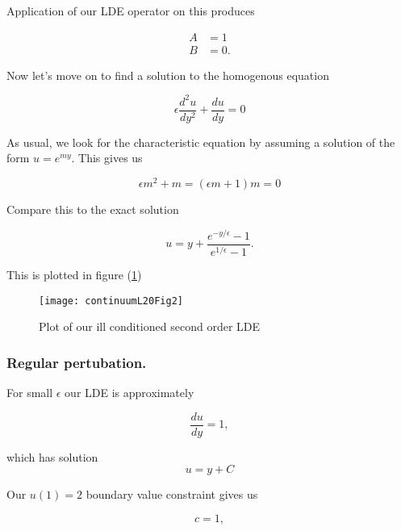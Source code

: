 Application of our LDE operator on this produces

\begin{align*}
A &= 1 \\
B &= 0.
\end{align*}

Now let's move on to find a solution to the homogenous equation

\begin{equation}\label{eqn:continuumL20:30b}
\epsilon \frac{d^2u}{dy^2} + \frac{du}{dy} = 0
\end{equation}

As usual, we look for the characteristic equation by assuming a solution of the form $u = e^{m y}$.  This gives us

\begin{equation}\label{eqn:continuumL20:n}
\epsilon m^2 + m = (\epsilon m + 1) m = 0
\end{equation}

Compare this to the exact solution

\begin{equation}\label{eqn:continuumL20:310}
u = y + \frac{e^{-y/\epsilon} - 1}{e^{1/\epsilon} - 1}.
\end{equation}

This is plotted in figure (\ref{fig:continuumL20:continuumL20Fig2})
\begin{figure}[htp]
   \centering
   \texttt{[image: continuumL20Fig2]}
   \caption{Plot of our ill conditioned second order LDE}\label{fig:continuumL20:continuumL20Fig2}
\end{figure}

\subsubsection{Regular pertubation.}

For small $\epsilon$ our LDE is approximately

\begin{equation}\label{eqn:continuumL20:n}
\frac{du}{dy} = 1,
\end{equation}

which has solution
\begin{equation}\label{eqn:continuumL20:n}
u = y + C 
\end{equation}

Our $u(1) = 2$ boundary value constraint gives us

\begin{equation}\label{eqn:continuumL20:n}
c = 1,
\end{equation}

